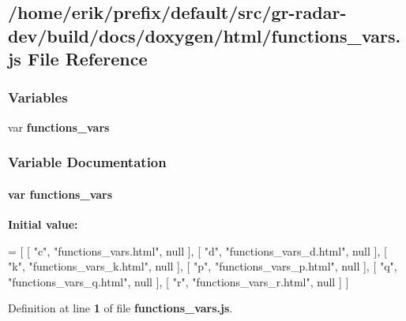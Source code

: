 \subsection{/home/erik/prefix/default/src/gr-\/radar-\/dev/build/docs/doxygen/html/functions\+\_\+vars.js File Reference}
\label{functions__vars_8js}
\subsubsection*{Variables}
\begin{DoxyCompactItemize}
\item 
var {\bf functions\+\_\+vars}
\end{DoxyCompactItemize}


\subsubsection{Variable Documentation}
\paragraph[{functions\+\_\+vars}]{\setlength{\rightskip}{0pt plus 5cm}var functions\+\_\+vars}\label{functions__vars_8js_a493a62a77b6329c7d3ab903f7ebbd202}
{\bfseries Initial value\+:}
\begin{DoxyCode}
=
[
    [ \textcolor{stringliteral}{"c"}, \textcolor{stringliteral}{"functions\_vars.html"}, null ],
    [ \textcolor{stringliteral}{"d"}, \textcolor{stringliteral}{"functions\_vars\_d.html"}, null ],
    [ \textcolor{stringliteral}{"k"}, \textcolor{stringliteral}{"functions\_vars\_k.html"}, null ],
    [ \textcolor{stringliteral}{"p"}, \textcolor{stringliteral}{"functions\_vars\_p.html"}, null ],
    [ \textcolor{stringliteral}{"q"}, \textcolor{stringliteral}{"functions\_vars\_q.html"}, null ],
    [ \textcolor{stringliteral}{"r"}, \textcolor{stringliteral}{"functions\_vars\_r.html"}, null ]
]
\end{DoxyCode}


Definition at line {\bf 1} of file {\bf functions\+\_\+vars.\+js}.

